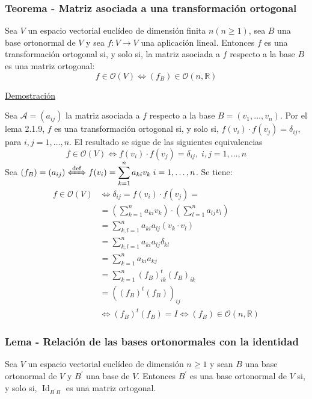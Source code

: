 \documentclass[12pt, a4paper, ones, notitlepage, openany,titlepage]{article}
\newcommand{\demostracion}{\noindent\underline{Demostración}}
\begin{document}
\subsubsection{Teorema - Matriz asociada a una transformación ortogonal}
Sea $V$ un espacio vectorial euclídeo de dimensión finita $n (n \ge 1)$, sea $B$ una base ortonormal de $V$ y sea $f: V \rightarrow V$ una aplicación lineal. Entonces $f$ es una transformación ortogonal si, y solo si, la matriz asociada a $f$ respecto a la base $B$ es una matriz ortogonal:
$$
f \in \mathcal{O}(V) \Longleftrightarrow \left(f_B\right) \in \mathcal{O}(n,\mathbb{R})
$$

\demostracion

Sea $\mathcal{A}=\left(a_{i j}\right)$ la matriz asociada a $f$ respecto a la base $B=\left(v_{1}, \ldots, v_{n}\right)$. Por el lema 2.1.9, $f$ es una transformación ortogonal si, y solo si, $f\left(v_{i}\right) \cdot f\left(v_{j}\right)=\delta_{i j}$, para $i, j=1, \ldots, n$. El resultado se sigue de las siguientes equivalencias
$$
f \in \mathcal{O}(V) \Longleftrightarrow f(v_i) \cdot f(v_j) = \delta_{ij}, \; i,j = 1,\ldots,n
$$
Sea $\displaystyle \left(f_B\right) = (a_{ij}) \xLeftrightarrow{\operatorname{def}} f(v_i) = \sum_{k=1}^{n} a_{ki} v_k \; i = 1,\ldots,n$. Se tiene:
$$
\begin{aligned}
	f \in \mathcal{O}(V) & \Longleftrightarrow \delta_{i j} = f\left(v_{i}\right) \cdot f\left(v_{j}\right) = \\
	& = \left(\sum_{k=1}^{n} a_{k i} v_{k}\right) \cdot\left(\sum_{l=1}^{n} a_{l j} v_{l}\right) \\
	& = \sum_{k, l=1}^{n} a_{k i} a_{l j} (v_k \cdot v_l) \\
	& = \sum_{k, l=1}^{n} a_{k i} a_{l j} \delta_{k l} \\
	& = \sum_{k=1}^{n} a_{k i} a_{k j} \\
	& = \sum_{k = 1}^{n} (f_B)^t_{ik} (f_B)_{ik} \\
	& = \left( (f_B)^t (f_B) \right)_{ij} \\
	& \Longleftrightarrow (f_B)^t (f_B) = I \Longleftrightarrow (f_B) \in \mathcal{O} (n, \mathbb{R})
\end{aligned}
$$

\subsubsection{Lema - Relación de las bases ortonormales con la identidad}
Sea $V$ un espacio vectorial euclídeo de dimensión $n \geq 1$ y sean $B$ una base ortonormal de $V$ y $B^{\prime}$ una base de $V$. Entonces $B^{\prime}$ es una base ortonormal de $V$ si, y solo si, $\operatorname{Id}_{B^{\prime} B}$ es una matriz ortogonal.\\
\end{document}
